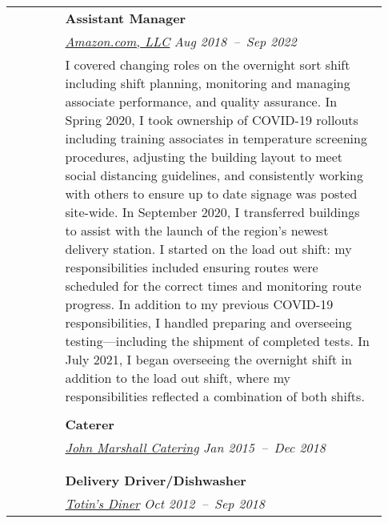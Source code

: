 \documentclass[letterpaper, 10pt, oneside]{article}
\newcommand{\bdit}[1]{{\textbf{#1}}}
\begin{document}
\begin{longtable}{@{} p{0.13\linewidth} p{0.8\linewidth}}
  & \bdit{Assistant Manager}
  \hfill  \\
  & \textsl{\href{https://www.aboutamazon.com/}{Amazon.com, LLC}}
  \hfill \textsl{Aug 2018\ --\ Sep 2022} \\
  
  & \parbox{0.8\textwidth}{I covered changing roles on the overnight sort
    shift including shift planning, monitoring and managing associate
    performance, and quality assurance. In Spring 2020, I took ownership of
    COVID-19 rollouts including training associates in temperature screening
    procedures, adjusting the building layout to meet social distancing
    guidelines, and consistently working with others to ensure up to date
    signage was posted site-wide. In September 2020, I transferred buildings
    to assist with the launch of the region’s newest delivery station. I
    started on the load out shift: my responsibilities included ensuring
    routes were scheduled for the correct times and monitoring route
    progress. In addition to my previous COVID-19 responsibilities, I handled
    preparing and overseeing testing—including the shipment of completed
    tests. In July 2021, I began overseeing the overnight shift in addition
    to the load out shift, where my responsibilities reflected a combination
    of both shifts.}
  \\
  \\
  & \bdit{Caterer}
  \hfill  \\
  & \textsl{\href{https://www.johnmarshallcatering.com/}{John Marshall Catering}}
  \hfill \textsl{Jan 2015\ --\ Dec 2018} \\
  
  & \parbox{0.8\textwidth}{}
  \\
  \\
  & \bdit{Delivery Driver/Dishwasher}
  \hfill  \\
  & \textsl{\href{https://www.totinsdiner.org/}{Totin's Diner}}
  \hfill \textsl{Oct 2012\ --\ Sep 2018} \\
  

\end{longtable}
\end{document}
